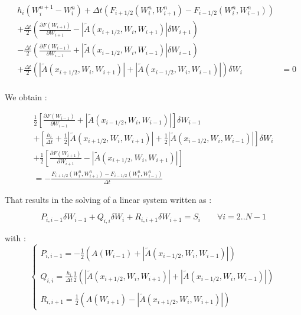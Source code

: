 \begin{eqnarray}
 & h_{i} (W_{i}^{n+1}-W_{i}^{n}) + \Delta t \left ( F_{i+1/2}(W_{i}^n,W_{i+1}^n) - F_{i-1/2}(W_{i}^n,W_{i-1}^n) \right ) & \nonumber \\
 & + \frac{\Delta t}{2} \left ( \frac{\partial F(W_{i+1})}{\partial W_{i+1}} - |\tilde{A}(x_{i+1/2},W_i,W_{i+1})|\delta W_{i+1} \right ) & \nonumber \\
 & - \frac{\Delta t}{2} \left ( \frac{\partial F(W_{i-1})}{\partial W_{i-1}} + |\tilde{A}(x_{i-1/2},W_i,W_{i-1})|\delta W_{i-1} \right ) & \nonumber \\
 & + \frac{\Delta t}{2} \left ( |\tilde{A}(x_{i+1/2},W_i,W_{i+1})| + |\tilde{A}(x_{i-1/2},W_i,W_{i-1})| \right ) \delta W_i & = 0 \nonumber \\
\end{eqnarray}

We obtain :

\begin{eqnarray}
 & \frac{1}{2} \left [ \frac{\partial F(W_{i-1})}{\partial W_{i-1}} + |\tilde{A}(x_{i-1/2},W_i,W_{i-1})| \right ]\delta W_{i-1} & \nonumber \\
& + \left [ \frac{h_i}{\Delta t} + \frac{1}{2}|\tilde{A}(x_{i+1/2},W_i,W_{i+1})| +  \frac{1}{2} |\tilde{A}(x_{i-1/2},W_i,W_{i-1})| \right ] \delta W_i & \nonumber \\
& + \frac{1}{2} \left [ \frac{\partial F(W_{i+1})}{\partial W_{i+1}} - |\tilde{A}(x_{i+1/2},W_i,W_{i+1})| \right ] & \nonumber \\
& = - \frac{F_{i+1/2}(W_{i}^n,W_{i+1}^n) - F_{i-1/2}(W_{i}^n,W_{i-1}^n)}{\Delta t}
\end{eqnarray}

That results in the solving of a linear system written as :

\begin{equation}
 P_{i,i-1}\delta W_{i-1} + Q_{i,i} \delta W_i + R_{i,i+1} \delta W_{i+1} = S_i \qquad \forall i=2..N-1
\end{equation}

with :
\begin{equation}
\left \lbrace
  \begin{array}{l}
   P_{i,i-1} = - \frac{1}{2} (A(W_{i-1}) +|\tilde{A}(x_{i-1/2},W_i,W_{i-1})| ) \\
   \\
   Q_{i,i} = \frac{h_i}{\Delta t} \frac{1}{2}(|\tilde{A}(x_{i+1/2},W_i,W_{i+1})| + |\tilde{A}(x_{i-1/2},W_i,W_{i-1})|)\\
   \\
   R_{i,i+1} = \frac{1}{2} (A(W_{i+1}) -|\tilde{A}(x_{i+1/2},W_i,W_{i+1})|)
\end{array}
 \right.
\end{equation}

